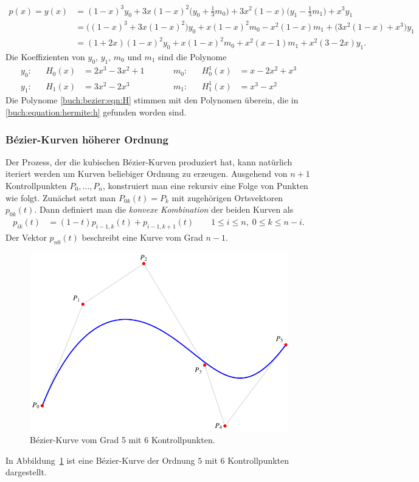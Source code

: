 \begin{align*}
p(x)
=
y(x)
&=
(1-x)^3 y_0
+
3x(1-x)^2\biggl(y_0+\frac13m_0\biggr)
+
3x^2(1-x) \biggl(y_1-\frac13m_1\biggr)
+
x^3 y_1
\\
&=
\bigl((1-x)^3+3x(1-x)^2\bigr)
y_0
+
x(1-x)^2 m_0
-
x^2(1-x) m_1
+
\bigl(3x^2(1-x)+x^3\bigr)
y_1
\\
&=
(1+2x)(1-x)^2 y_0
+
x(1-x)^2 m_0
+
x^2(x-1) m_1
+
x^2(3-2x) y_1.
\end{align*}
Die Koeffizienten von $y_0$, $y_1$, $m_0$ und $m_1$ sind die Polynome
\begin{equation}
\begin{aligned}
y_0:&&
H_0(x)
&=
2x^3-3x^2+1
&\quad&
&m_0:&&
H_0^1(x)
&=
x-2x^2+x^3
\\
y_1:&&
H_1(x)
&=
3x^2-2x^3
&\quad&
&m_1:&&
H_1^1(x)
&=
x^3-x^2
\end{aligned}
\label{buch:bezier:eqn:H}
\end{equation}
Die Polynome \eqref{buch:bezier:eqn:H} stimmen mit den Polynomen überein,
die in \eqref{buch:equation:hermite:h} gefunden worden sind.

%
%
\subsubsection{Bézier-Kurven höherer Ordnung}
Der Prozess, der die kubischen Bézier-Kurven produziert hat, kann natürlich
iteriert werden um Kurven beliebiger Ordnung zu erzeugen.
Ausgehend von $n+1$ Kontrollpunkten $P_0,\dots,P_n$, konstruiert man eine
rekursiv eine Folge von Punkten wie folgt.
Zunächst setzt man $P_{0k}(t) = P_k$ mit zugehörigen Ortsvektoren $p_{0k}(t)$.
Dann definiert man die {\em konvexe Kombination} der beiden Kurven als
\begin{align*}
p_{ik}(t) &= (1-t)  p_{i-1,k}(t) + p_{i-1,k+1}(t)
\qquad
1\le i \le n,\; 
0\le k\le n - i.
\end{align*}
Der Vektor $p_{n0}(t)$ beschreibt eine Kurve vom Grad $n-1$.
\begin{figure}
\centering
\includegraphics{chapters/30-interpolation/figures/beziern.pdf}
\caption{Bézier-Kurve vom Grad 5 mit 6 Kontrollpunkten.
\label{buch:bezier:figure:beziern}}
\end{figure}
In Abbildung~\ref{buch:bezier:figure:beziern} ist eine Bézier-Kurve
der Ordnung $5$ mit 6 Kontrollpunkten dargestellt.

